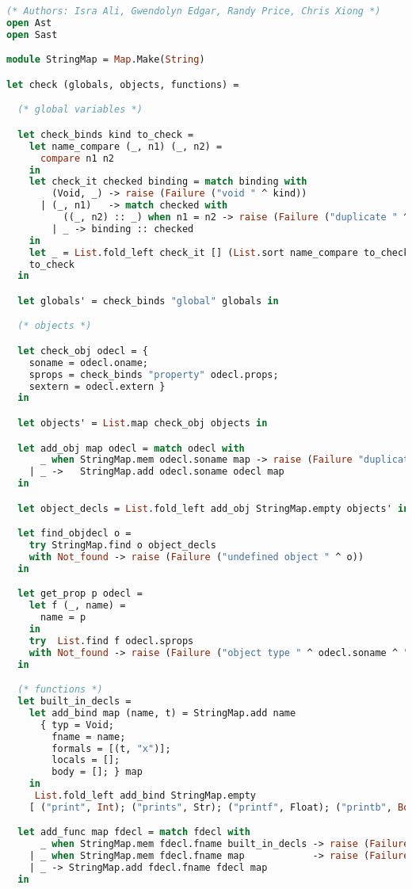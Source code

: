 \begin{lstlisting}[language=Caml,backgroundcolor=\color{backgroundcolor}]
(* Authors: Isra Ali, Gwendolyn Edgar, Randy Price, Chris Xiong *)
open Ast
open Sast

module StringMap = Map.Make(String)

let check (globals, objects, functions) =

  (* global variables *)

  let check_binds kind to_check =
    let name_compare (_, n1) (_, n2) =
      compare n1 n2
    in
    let check_it checked binding = match binding with
        (Void, _) -> raise (Failure ("void " ^ kind))
      | (_, n1)   -> match checked with
          ((_, n2) :: _) when n1 = n2 -> raise (Failure ("duplicate " ^ kind))
        | _ -> binding :: checked
    in
    let _ = List.fold_left check_it [] (List.sort name_compare to_check) in
    to_check
  in

  let globals' = check_binds "global" globals in

  (* objects *)

  let check_obj odecl = {
    soname = odecl.oname;
    sprops = check_binds "property" odecl.props;
    sextern = odecl.extern }
  in

  let objects' = List.map check_obj objects in

  let add_obj map odecl = match odecl with
      _ when StringMap.mem odecl.soname map -> raise (Failure "duplicate objdef")
    | _ ->   StringMap.add odecl.soname odecl map
  in

  let object_decls = List.fold_left add_obj StringMap.empty objects' in

  let find_objdecl o =
    try StringMap.find o object_decls
    with Not_found -> raise (Failure ("undefined object " ^ o))
  in

  let get_prop p odecl =
    let f (_, name) =
      name = p
    in
    try  List.find f odecl.sprops
    with Not_found -> raise (Failure ("object type " ^ odecl.soname ^ " has no property " ^ p))
  in

  (* functions *)
  let built_in_decls =
    let add_bind map (name, t) = StringMap.add name
      { typ = Void;
        fname = name;
        formals = [(t, "x")];
        locals = [];
        body = []; } map
    in
     List.fold_left add_bind StringMap.empty 
    [ ("print", Int); ("prints", Str); ("printf", Float); ("printb", Bool)] in

  let add_func map fdecl = match fdecl with
      _ when StringMap.mem fdecl.fname built_in_decls -> raise (Failure (fdecl.fname ^ " is already a built-in function"))
    | _ when StringMap.mem fdecl.fname map            -> raise (Failure ("duplicate function " ^ fdecl.fname))
    | _ -> StringMap.add fdecl.fname fdecl map
  in


\end{lstlisting}
